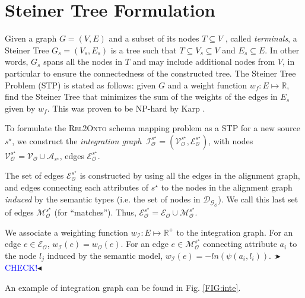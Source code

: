 \documentclass[letterpaper]{article} %
\newcommand{\authornote}[3]{
  {\fbox{\sc 
  #1}:$\blacktriangleright$\textcolor{#2}{\small{#3}}$\blacktriangleleft$}%
}
\newcommand{\ddg}[1]{\authornote{DDG}{blue}{#1}}
\newcommand{\relonto}{\textsc{Rel2Onto}}
\begin{document}
 

\section{Steiner Tree Formulation \label{SEC:STP}}

Given a graph $G =
(V, E)$ and a subset of its nodes $T \subseteq V$ , called \emph{terminals}, a 
Steiner Tree $G_s = (V_s, E_s )$ is a tree such that $T \subseteq V_s \subseteq 
V$ and $E_s \subseteq E$. In other words, $G_s$ spans all the nodes in $T$ and 
may include additional nodes from $V$, in particular to ensure the 
connectedness of the constructed tree. The Steiner Tree Problem 
(STP) is stated as follows: given $G$ and a weight function $w_f : E 
\mapsto \mathbb{R}$, find the Steiner Tree that minimizes the sum of the 
weights of the edges in $E_s$ given by $w_f$. This was proven to be NP-hard 
by Karp \cite{Karp1972}.

To formulate the \relonto{} schema mapping problem as a STP for a new source 
$s^\star$, we construct the 
\emph{integration graph} $~\mathcal{I}_\mathcal{O}^{s^\star} = 
(\mathcal{V}_\mathcal{O}^{s^\star},\mathcal{E}_\mathcal{O}^{s^\star})$, with 
nodes $\mathcal{V}_\mathcal{O}^{s^\star} = \mathcal{V_O} \cup 
\mathcal{A}_{s^\star}$, 
edges $\mathcal{E}_\mathcal{O}^{s^\star}$.

The set of edges $\mathcal{E}_\mathcal{O}^{s^\star}$ is constructed by using 
all the edges in the alignment 
graph, and edges connecting each attributes of $s^\star$ to the nodes in the 
alignment graph \emph{induced} by the semantic types (i.e. the set of nodes in 
$\mathcal{D_{G_O}}$). We call this last set 
of edges $\mathcal{M}_\mathcal{O}^{s^\star}$ (for ``matches''). Thus, 
$\mathcal{E}_\mathcal{O}^{s^\star} = 
\mathcal{E_O} \cup \mathcal{M}_\mathcal{O}^{s^\star}$.

We associate a weighting function  $w_\mathcal{I} : E \mapsto \mathbb{R}^+$ to 
the integration graph. For an edge $e \in \mathcal{E_O}$, $w_\mathcal{I}(e) = 
w_\mathcal{O}(e)$. For an edge $e 
\in \mathcal{M}_\mathcal{O}^{s^\star}$ connecting attribute $a_i$ to the node 
$l_j$ induced by the semantic model, $w_\mathcal{I}(e) = - 
ln(\psi(a_i,l_i))$. \ddg{CHECK!}

An example of integration graph can be found in Fig. \ref{FIG:inte}.
\end{document}

